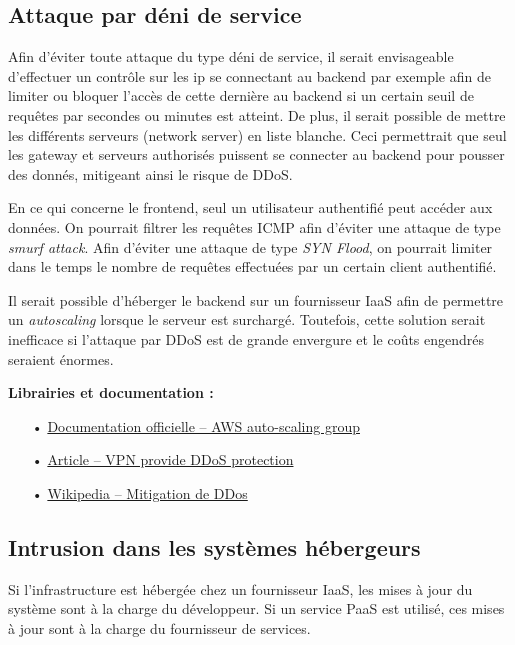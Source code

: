 \subsection{Attaque par déni de service}
\label{ssec:cm-ddos}

Afin d'éviter toute attaque du type déni de service, il serait envisageable d'effectuer un contrôle sur les ip se connectant au backend par exemple afin de limiter ou bloquer l'accès de cette dernière au backend si un certain seuil de requêtes par secondes ou minutes est atteint. De plus, il serait possible de mettre les différents serveurs (network server) en liste blanche. Ceci permettrait que seul les gateway et serveurs authorisés puissent se connecter au backend pour pousser des donnés, mitigeant ainsi le risque de DDoS.

En ce qui concerne le frontend, seul un utilisateur authentifié peut accéder aux données. On pourrait filtrer les requêtes ICMP afin d'éviter une attaque de type \textit{smurf attack}. Afin d'éviter une attaque de type \textit{SYN Flood}, on pourrait limiter dans le temps le nombre de requêtes effectuées par un certain client authentifié.

Il serait possible d'héberger le backend sur un fournisseur IaaS afin de permettre un \textit{autoscaling} lorsque le serveur est surchargé. Toutefois, cette solution serait inefficace si l'attaque par DDoS est de grande envergure et le coûts engendrés seraient énormes.

\medskip
\textbf{Librairies et documentation :}

\begin{itemize}
\item[•] \href{https://docs.aws.amazon.com/autoscaling/ec2/userguide/AutoScalingGroup.html}{Documentation officielle -- AWS auto-scaling group}
\item[•] \href{https://vpn-services.bestreviews.net/vpn-provide-ddos-protection/}{Article -- VPN provide DDoS protection}
\item[•] \href{https://fr.wikipedia.org/wiki/Mitigation_de_DDoS}{Wikipedia -- Mitigation de DDos}
\end{itemize}

\subsection{Intrusion dans les systèmes hébergeurs}
\label{ssec:cm-intrusion}

Si l'infrastructure est hébergée chez un fournisseur IaaS, les mises à jour du système sont à la charge du développeur. Si un service PaaS est utilisé, ces mises à jour sont à la charge du fournisseur de services.

